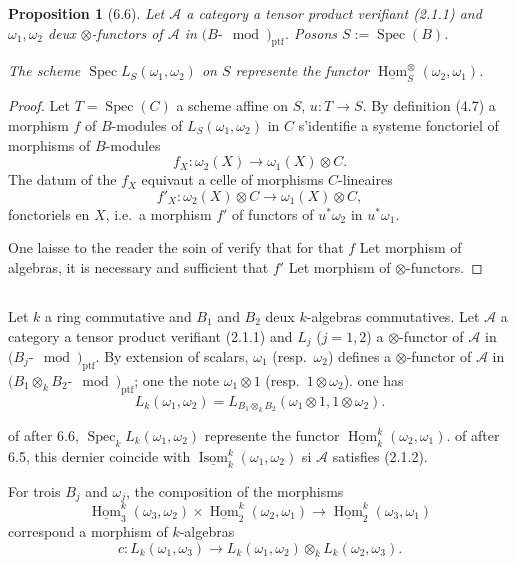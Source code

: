 \documentclass[12pt,a4paper]{article}
\theoremstyle{plain}
\newtheorem{proposition}[theorem]{Proposition}
\theoremstyle{definition}
\DeclareMathOperator{\Spec}{Spec}
\DeclareMathOperator{\Hom}{Hom}
\DeclareMathOperator{\Isom}{Isom}
\DeclareMathOperator{\ptf}{ptf}
\begin{document}
\begin{proposition}[6.6]
Let $\mathcal{A}$ a category a tensor product verifiant (2.1.1) and $\omega_1, \omega_2$ deux $\otimes$-functors of $\mathcal{A}$ in $(B\text{-}\mod)_{\ptf}$. Posons $S := \Spec(B)$.

The scheme $\Spec L_S(\omega_1, \omega_2)$ on $S$ represente the functor $\underline{\Hom}^\otimes_S(\omega_2, \omega_1)$.
\end{proposition}

\begin{proof}
Let $T = \Spec(C)$ a scheme affine on $S$, $u : T \to S$. By definition (4.7) a morphism $f$ of $B$-modules of $L_S(\omega_1, \omega_2)$ in $C$ s'identifie a systeme fonctoriel of morphisms of $B$-modules
\[
f_X : \omega_2(X) \to \omega_1(X) \otimes C.
\]
The datum of the $f_X$ equivaut a celle of morphisms $C$-lineaires
\[
f'_X : \omega_2(X) \otimes C \to \omega_1(X) \otimes C,
\]
fonctoriels en $X$, i.e.~a morphism $f'$ of functors of $u^*\omega_2$ in $u^*\omega_1$.

One laisse to the reader the soin of verify that for that $f$ Let morphism of algebras, it is necessary and sufficient that $f'$ Let morphism of $\otimes$-functors.
\end{proof}

\subsection{}

Let $k$ a ring commutative and $B_1$ and $B_2$ deux $k$-algebras commutatives. Let $\mathcal{A}$ a category a tensor product verifiant (2.1.1) and $L_j$ ($j=1,2$) a $\otimes$-functor of $\mathcal{A}$ in $(B_j\text{-}\mod)_{\ptf}$. By extension of scalars, $\omega_1$ (resp.~$\omega_2$) defines a $\otimes$-functor of $\mathcal{A}$ in $(B_1 \otimes_k B_2\text{-}\mod)_{\ptf}$; one the note $\omega_1 \otimes 1$ (resp.~$1 \otimes \omega_2$). one has
\[
L_k(\omega_1, \omega_2) = L_{B_1 \otimes_k B_2}(\omega_1 \otimes 1, 1 \otimes \omega_2).
\]

of after 6.6, $\Spec_k L_k(\omega_1, \omega_2)$ represente the functor $\underline{\Hom}^k_k(\omega_2, \omega_1)$. of after 6.5, this dernier coincide with $\underline{\Isom}^k_k(\omega_1, \omega_2)$ si $\mathcal{A}$ satisfies (2.1.2).

For trois $B_j$ and $\omega_j$, the composition of the morphisms
\[
\underline{\Hom}^k_3(\omega_3, \omega_2) \times \underline{\Hom}^k_2(\omega_2, \omega_1) \to \underline{\Hom}^k_2(\omega_3, \omega_1)
\]
correspond a morphism of $k$-algebras
\[
c : L_k(\omega_1, \omega_3) \to L_k(\omega_1, \omega_2) \otimes_k L_k(\omega_2, \omega_3).
\]
\end{document}
